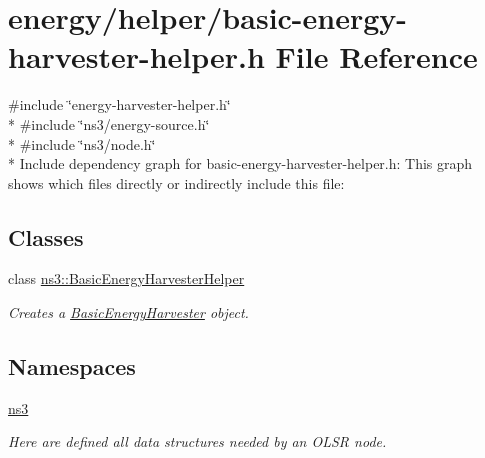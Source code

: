 \hypertarget{basic-energy-harvester-helper_8h}{}\section{energy/helper/basic-\/energy-\/harvester-\/helper.h File Reference}
\label{basic-energy-harvester-helper_8h}
{\ttfamily \#include \char`\"{}energy-\/harvester-\/helper.\+h\char`\"{}}\\*
{\ttfamily \#include \char`\"{}ns3/energy-\/source.\+h\char`\"{}}\\*
{\ttfamily \#include \char`\"{}ns3/node.\+h\char`\"{}}\\*
Include dependency graph for basic-\/energy-\/harvester-\/helper.h\+:
This graph shows which files directly or indirectly include this file\+:
\subsection*{Classes}
\begin{DoxyCompactItemize}
\item 
class \hyperlink{classns3_1_1BasicEnergyHarvesterHelper}{ns3\+::\+Basic\+Energy\+Harvester\+Helper}
\begin{DoxyCompactList}\small\item\em Creates a \hyperlink{classns3_1_1BasicEnergyHarvester}{Basic\+Energy\+Harvester} object. \end{DoxyCompactList}\end{DoxyCompactItemize}
\subsection*{Namespaces}
\begin{DoxyCompactItemize}
\item 
 \hyperlink{namespacens3}{ns3}
\begin{DoxyCompactList}\small\item\em Here are defined all data structures needed by an O\+L\+SR node. \end{DoxyCompactList}\end{DoxyCompactItemize}
